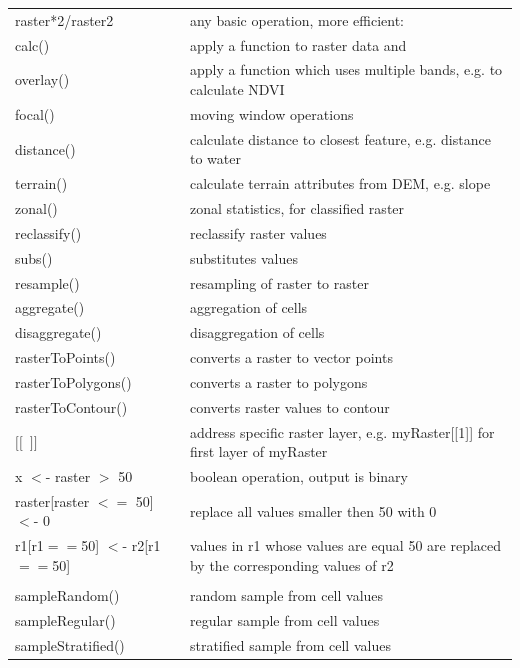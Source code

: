 \documentclass[10pt,landscape]{article}
\makeatletter
\renewcommand{\subsubsection}{\@startsection{subsubsection}{3}{0mm}%
                                {-1ex plus -.5ex minus -.2ex}%
                                {1ex plus .2ex}%
                                {\normalfont\small\bfseries}}
\makeatother
\begin{document}
\begin{multicols}{3}
\begin{tabular}{@{}p{\the\MyLen}%
                @{}p{\linewidth-\the\MyLen}@{}}
raster*2/raster2 & any basic operation, more efficient: \\                
calc()  	& apply a function to raster data and\\
overlay()       & apply a function which uses multiple bands, e.g. to calculate NDVI \\
focal()         & moving window operations \\
distance()      & calculate distance to closest feature, e.g. distance to water\\
terrain() 	& calculate terrain attributes from DEM, e.g. slope \\
zonal()         & zonal statistics, for classified raster\\
reclassify()	& reclassify raster values \\
subs()		& substitutes values \\
resample() 	& resampling of raster to raster \\
aggregate()	& aggregation of cells \\
disaggregate()	& disaggregation of cells \\
rasterToPoints() & converts a raster to vector points	\\
rasterToPolygons() & converts a raster to polygons \\
rasterToContour()  & converts raster values to contour \\
$[[$\ $]]$		& address specific raster layer, e.g. myRaster[[1]] for first layer of myRaster    \\  
x $<$- raster $>$ 50	& boolean operation, output is binary \\
raster[raster $<=$ 50] $<$- 0 & replace all values smaller then 50 with 0 \\
r1[r1$==$50] $<$- r2[r1$==$50] & values in r1 whose values are equal 50 are replaced by the corresponding values of r2 \\
		&			 \\
  sampleRandom() & random sample from cell values\\
  sampleRegular() & regular sample from cell values\\
  sampleStratified() & stratified sample from cell values\\
  
\end{tabular}


% 
% 
% 
% 



\end{multicols}
\end{document}
